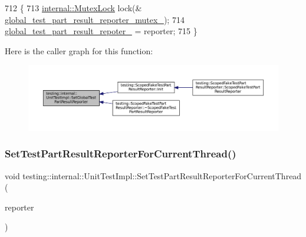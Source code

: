 \begin{DoxyCode}
712                                                \{
713   \hyperlink{namespacetesting_1_1internal_a08b187c6cc4e28400aadf9a32fccc8de}{internal::MutexLock} lock(&
      \hyperlink{classtesting_1_1internal_1_1UnitTestImpl_a57153c5c8caa229f0a62f35ab99f0a56}{global\_test\_part\_result\_reporter\_mutex\_});
714   \hyperlink{classtesting_1_1internal_1_1UnitTestImpl_ab9a275094df6adc7e16a92133a692c3e}{global\_test\_part\_result\_repoter\_} = reporter;
715 \}
\end{DoxyCode}
Here is the caller graph for this function\+:
\nopagebreak
\begin{figure}[H]
\begin{center}
\leavevmode
\includegraphics[width=350pt]{classtesting_1_1internal_1_1UnitTestImpl_a892b0e25b28af5e4400cf6fac336f2d8_icgraph}
\end{center}
\end{figure}
\mbox{\label{classtesting_1_1internal_1_1UnitTestImpl_a1403fc10aebcc64479c5ee980c9b4eb4}} 
\subsubsection{\texorpdfstring{Set\+Test\+Part\+Result\+Reporter\+For\+Current\+Thread()}{SetTestPartResultReporterForCurrentThread()}}
{\footnotesize\ttfamily void testing\+::internal\+::\+Unit\+Test\+Impl\+::\+Set\+Test\+Part\+Result\+Reporter\+For\+Current\+Thread (\begin{DoxyParamCaption}\item[{\hyperlink{classtesting_1_1TestPartResultReporterInterface}{Test\+Part\+Result\+Reporter\+Interface} $\ast$}]{reporter }\end{DoxyParamCaption})}




